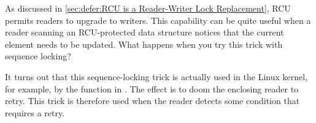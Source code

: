 As discussed in
\cref{sec:defer:RCU is a Reader-Writer Lock Replacement},
RCU permits readers to upgrade to writers.
This capability can be quite useful when a reader scanning an
RCU-protected data structure notices that the current element
needs to be updated.
What happens when you try this trick with sequence locking?

It turns out that this sequence-locking trick is actually used in
the Linux kernel, for example, by the  function in
.
The effect is to doom the enclosing reader to retry.
This trick is therefore used when the reader detects some condition
that requires a retry.
